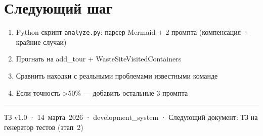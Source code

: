 \documentclass[11pt, a4paper, oneside]{article}
\begin{document}
\section{Следующий шаг}

\begin{okbox}[title={MVP за 1 день}]
\begin{enumerate}
  \item Python-скрипт \texttt{analyze.py}: парсер Mermaid + 2 промпта
    (компенсация + крайние случаи)
  \item Прогнать на add\_tour + WasteSiteVisitedContainers
  \item Сравнить находки с реальными проблемами известными команде
  \item Если точность \textgreater 50\% — добавить остальные 3 промпта
\end{enumerate}
\end{okbox}

\vfill
\hrule
\vspace{4mm}
{\small\color{MidGray}
  ТЗ v1.0 · 14~марта~2026 · development\_system ·
  Следующий документ: ТЗ на генератор тестов (этап~2)
}
\end{document}
